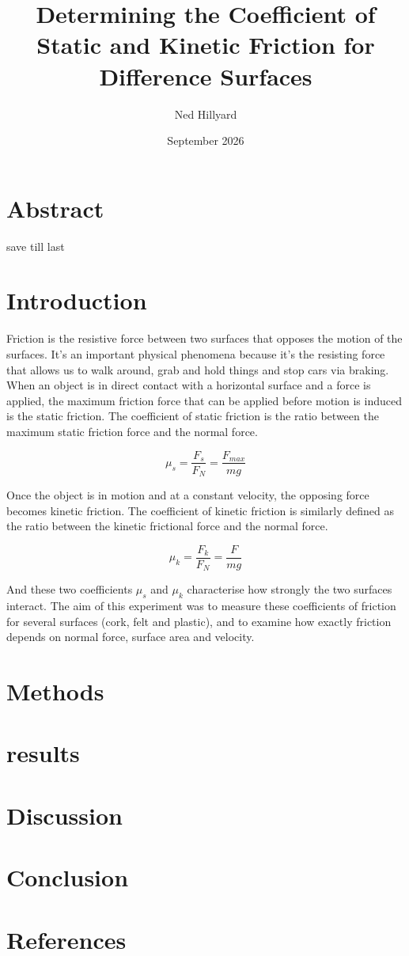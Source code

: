 \documentclass{article}
\title{\textbf{Determining the Coefficient of Static and Kinetic Friction for Difference Surfaces}}
\author{Ned Hillyard}
\date{September 2026}
\begin{document}
\maketitle

\section*{Abstract}
save till last 

\section*{Introduction}

Friction is the resistive force between two surfaces that opposes the motion of the surfaces. It's an important physical phenomena because it's the resisting force that allows us to walk around, grab and hold things and stop cars via braking. When an object is in direct contact with a horizontal surface and a force is applied, the maximum friction force that can be applied before motion is induced is the static friction. The coefficient of static friction is the ratio between the maximum static friction force and the normal force.

\begin{equation}
    \mu_s = \frac{F_s}{F_N} = \frac{F_{max}}{mg}
\end{equation}

Once the object is in motion and at a constant velocity, the opposing force becomes kinetic friction. The coefficient of kinetic friction is similarly defined as the ratio between the kinetic frictional force and the normal force.

\begin{equation}
    \mu_k = \frac{F_k}{F_N} = \frac{F}{mg}
\end{equation}

And these two coefficients $\mu_s$ and $\mu_k$ characterise how strongly the two surfaces interact. The aim of this experiment was to measure these coefficients of friction for several surfaces (cork, felt and plastic), and to examine how exactly friction depends on normal force, surface area and velocity.

\section*{Methods}

\section*{results}

\section*{Discussion}

\section*{Conclusion}

\section*{References}
\end{document}
